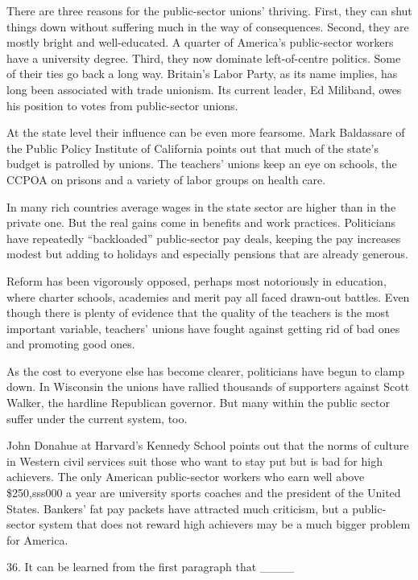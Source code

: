\documentclass[UTF8,11pt]{ctexart}
\begin{document}
There are three reasons for the public-sector unions’ thriving. First, they can shut things down without suffering much in the way of consequences. Second, they are mostly bright and well-educated. A quarter of America’s public-sector workers have a university degree. Third, they now dominate left-of-centre politics. Some of their ties go back a long way. Britain’s Labor Party, as its name implies, has long been associated with trade unionism. Its current leader, Ed Miliband, owes his position to votes from public-sector unions.


At the state level their influence can be even more fearsome. Mark Baldassare of the Public Policy Institute of California points out that much of the state’s budget is patrolled by unions. The teachers’ unions keep an eye on schools, the CCPOA on prisons and a variety of labor groups on health care.


In many rich countries average wages in the state sector are higher than in the private one. But the real gains come in benefits and work practices. Politicians have repeatedly “backloaded” public-sector pay deals, keeping the pay increases modest but adding to holidays and especially pensions that are already generous.


Reform has been vigorously opposed, perhaps most notoriously in education, where charter schools, academies and merit pay all faced drawn-out battles. Even though there is plenty of evidence that the quality of the teachers is the most important variable, teachers’ unions have fought against getting rid of bad ones and promoting good ones.


As the cost to everyone else has become clearer, politicians have begun to clamp down. In Wisconsin the unions have rallied thousands of supporters against Scott Walker, the hardline Republican governor. But many within the public sector suffer under the current system, too.


John Donahue at Harvard’s Kennedy School points out that the norms of culture in Western civil services suit those who want to stay put but is bad for high achievers. The only American public-sector workers who earn well above \$250,sss000 a year are university sports coaches and the president of the United States. Bankers’ fat pay packets have attracted much criticism, but a public-sector system that does not reward high achievers may be a much bigger problem for America.


36. It can be learned from the first paragraph that \_\_\_\_
\end{document}
